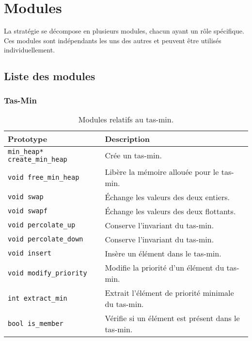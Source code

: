 \chapter{Modules}
\label{chap:modules}

La stratégie se décompose en plusieurs modules, chacun ayant un rôle spécifique.
Ces modules sont indépendants les uns des autres et peuvent être utilisés individuellement.

\section{Liste des modules}

\subsection{Tas-Min}

\begin{table}[!htpb]
    \label{tab:modules-min_heap}
    \begin{tabularx}{\textwidth}{lX}
        \toprule
        \textbf{Prototype} & \textbf{Description} \\
        \midrule
        \texttt{min\_heap* create\_min\_heap} & Crée un tas-min. \\
        \texttt{void free\_min\_heap} & Libère la mémoire allouée pour le tas-min. \\
        \texttt{void swap} & Échange les valeurs des deux entiers. \\
        \texttt{void swapf} & Échange les valeurs des deux flottants. \\
        \texttt{void percolate\_up} & Conserve l'invariant du tas-min. \\
        \texttt{void percolate\_down} & Conserve l'invariant du tas-min. \\
        \texttt{void insert} & Insère un élément dans le tas-min. \\
        \texttt{void modify\_priority} & Modifie la priorité d'un élément du tas-min. \\
        \texttt{int extract\_min} & Extrait l'élément de priorité minimale du tas-min. \\
        \texttt{bool is\_member} & Vérifie si un élément est présent dans le tas-min. \\
        \bottomrule
    \end{tabularx}
    \caption{Modules relatifs au tas-min.}
\end{table}

